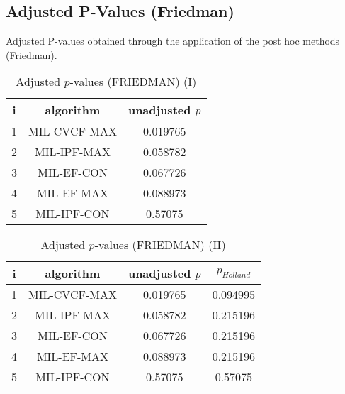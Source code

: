 \documentclass[a4paper,10pt]{article}
\begin{document}
\begin{landscape}
\newpage

\section{Adjusted P-Values (Friedman)}


Adjusted P-values obtained through the application of the post hoc methods (Friedman).

\begin{table}[!htp]
\centering\small
\begin{tabular}{ccc}
i&algorithm&unadjusted $p$\\
\hline1&MIL-CVCF-MAX&0.019765\\2&MIL-IPF-MAX&0.058782\\3&MIL-EF-CON&0.067726\\4&MIL-EF-MAX&0.088973\\5&MIL-IPF-CON&0.57075\\\hline
\end{tabular}
\caption{Adjusted $p$-values (FRIEDMAN) (I)}
\end{table}
\begin{table}[!htp]
\centering\small
\begin{tabular}{cccc}
i&algorithm&unadjusted $p$&$p_{Holland}$\\
\hline1&MIL-CVCF-MAX&0.019765&0.094995\\2&MIL-IPF-MAX&0.058782&0.215196\\3&MIL-EF-CON&0.067726&0.215196\\4&MIL-EF-MAX&0.088973&0.215196\\5&MIL-IPF-CON&0.57075&0.57075\\\hline
\end{tabular}
\caption{Adjusted $p$-values (FRIEDMAN) (II)}
\end{table}

\newpage
\end{landscape}
\end{document}
